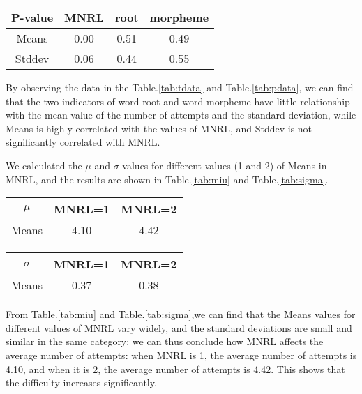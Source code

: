 \documentclass[12pt]{article}  %
\begin{document}
\begin{table*}
	\centering
	\begin{tabular}{  |c|c|c|c|
		}
		
		\hline
		P-value 	& MNRL	& root	 & morpheme \\ 
		\hline
		Means	& 0.00  &  0.51 & 0.49 \\ 
		\hline 
		Stddev & 0.06 & 0.44 & 0.55  \\ 
		\hline 
		
	\end{tabular}
	\caption{P-value data}
	\label{tab:pdata}
\end{table*}
By observing the data in the Table.\ref{tab:tdata} and Table.\ref{tab:pdata}, we can find that the two indicators of word root and word morpheme have little relationship with the mean value of the number of attempts and the standard deviation, while Means is highly correlated with the values of MNRL, and Stddev is not significantly correlated with MNRL.

We calculated the $\mu$ and $\sigma$ values for different values (1 and 2) of Means in MNRL, and the results are shown in Table.\ref{tab:miu} and Table.\ref{tab:sigma}.
\begin{table*}
	\centering
	\begin{tabular}{  |c|c|c|
		}
		
		\hline
		$\mu$ 	& MNRL=1 & MNRL=2 \\ 
		\hline
		Means	& 4.10  &  4.42 \\ 
		\hline 
		
	\end{tabular}
	\caption{Means' $\mu$  of different MNRL}
	\label{tab:miu}
\end{table*}

\begin{table*}
	\centering
	\begin{tabular}{  |c|c|c|
		}
		
		\hline
		$\sigma$ 	& MNRL=1 & MNRL=2 \\ 
		\hline
		Means	& 0.37  &  0.38 \\ 
		\hline 
		
	\end{tabular}
	\caption{Means' $\sigma$ of different MNRL}
	\label{tab:sigma}
\end{table*}

From Table.\ref{tab:miu} and Table.\ref{tab:sigma},we can find that the Means values for different values of MNRL vary widely, and the standard deviations are small and similar in the same category; we can thus conclude how MNRL affects the average number of attempts: when MNRL is 1, the average number of attempts is 4.10, and when it is 2, the average number of attempts is 4.42. This shows that the difficulty increases significantly.
\end{document}
